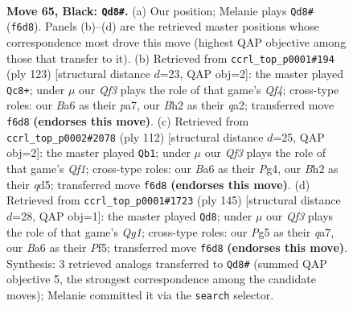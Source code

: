 \documentclass[11pt]{article}
\begin{document}
\clearpage

\begin{figure}[p]\centering
\begin{subfigure}{0.46\textwidth}\centering
\resizebox{\linewidth}{!}{%
\newchessgame
\chessboard[
  setfen={6K1/8/b4qk1/6p1/8/8/7b/8 b - - 3 65},
  showmover=false,
  pgfstyle=straightmove, color=movearrow, markmove={f6-d8}
]}
\caption{}
\end{subfigure}\hfill
\begin{subfigure}{0.46\textwidth}\centering
\resizebox{\linewidth}{!}{%
\newchessgame
\chessboard[
  setfen={8/P7/2K2pk1/5q2/2p5/8/Q7/8 b - - 18 62},
  showmover=false,
  pgfstyle=straightmove, color=movearrow, markmove={f5-c8}
]}
\caption{}
\end{subfigure}
\\[4pt]
\begin{subfigure}{0.46\textwidth}\centering
\resizebox{\linewidth}{!}{%
\newchessgame
\chessboard[
  setfen={8/6k1/8/3q2p1/6P1/8/5P2/5QK1 w - - 34 57},
  showmover=false,
  pgfstyle=straightmove, color=movearrow, markmove={f1-b1}
]}
\caption{}
\end{subfigure}\hfill
\begin{subfigure}{0.46\textwidth}\centering
\resizebox{\linewidth}{!}{%
\newchessgame
\chessboard[
  setfen={6q1/Q7/8/5pk1/8/1P6/7K/8 b - - 5 73},
  showmover=false,
  pgfstyle=straightmove, color=movearrow, markmove={g8-d8}
]}
\caption{}
\end{subfigure}
\caption{\textbf{Move 65, Black: \texttt{Qd8\#}.} (a) Our position; Melanie plays \texttt{Qd8\#} (\texttt{f6d8}). Panels (b)--(d) are the retrieved master positions whose correspondence most drove this move (highest QAP objective among those that transfer to it). (b) Retrieved from \texttt{ccrl\_top\_p0001\#194} (ply 123) [structural distance $d$=23, QAP obj=2]: the master played \texttt{Qc8+}; under $\mu$ our \emph{Qf3} plays the role of that game's \emph{Qf4}; cross-type roles: our \emph{B}a6 as their \emph{p}a7, our \emph{B}h2 as their \emph{q}a2; transferred move \texttt{f6d8} \textbf{(endorses this move)}. (c) Retrieved from \texttt{ccrl\_top\_p0002\#2078} (ply 112) [structural distance $d$=25, QAP obj=2]: the master played \texttt{Qb1}; under $\mu$ our \emph{Qf3} plays the role of that game's \emph{Qf1}; cross-type roles: our \emph{B}a6 as their \emph{P}g4, our \emph{B}h2 as their \emph{q}d5; transferred move \texttt{f6d8} \textbf{(endorses this move)}. (d) Retrieved from \texttt{ccrl\_top\_p0001\#1723} (ply 145) [structural distance $d$=28, QAP obj=1]: the master played \texttt{Qd8}; under $\mu$ our \emph{Qf3} plays the role of that game's \emph{Qg1}; cross-type roles: our \emph{P}g5 as their \emph{q}a7, our \emph{B}a6 as their \emph{P}f5; transferred move \texttt{f6d8} \textbf{(endorses this move)}. Synthesis: 3 retrieved analogs transferred to \texttt{Qd8\#} (summed QAP objective 5, the strongest correspondence among the candidate moves); Melanie committed it via the \texttt{search} selector.}
\label{fig:thought-m129}
\end{figure}
\end{document}
